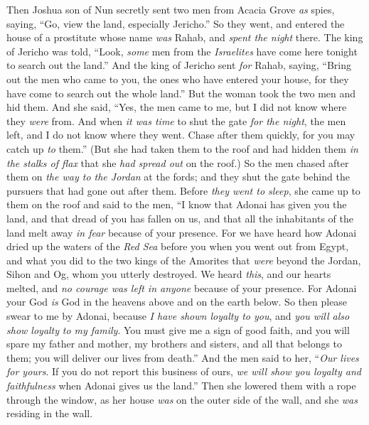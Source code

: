 \begin{biblechapter} %
 Then Joshua son of Nun secretly sent two men from Acacia Grove \textit{as} spies, saying, “Go, view the land, especially Jericho.” So they went, and entered the house of a prostitute whose name \textit{was} Rahab, and \textit{spent the night} there.
\verse The king of Jericho was told, “Look, \textit{some} men from the \textit{Israelites} have come here tonight to search out the land.”
\verse And the king of Jericho sent \textit{for} Rahab, saying, “Bring out the men who came to you, the ones who have entered your house, for they have come to search out the whole land.”
\verse But the woman took the two men and hid them. And she said, “Yes, the men came to me, but I did not know where they \textit{were} from.
\verse And when \textit{it was time} to shut the gate \textit{for the night}, the men left, and I do not know where they went. Chase after them quickly, for you may catch up \textit{to} them.”
\verse (But she had taken them to the roof and had hidden them \textit{in the stalks of flax} that she \textit{had spread out} on the roof.)
\verse So the men chased after them on \textit{the way to the Jordan} at the fords; and they shut the gate behind the pursuers that had gone out after them.
\verse Before \textit{they went to sleep}, she came up to them on the roof
\verse and said to the men, “I know that Adonai has given you the land, and that dread of you has fallen on us, and that all the inhabitants of the land melt away \textit{in fear} because of your presence.
\verse For we have heard how Adonai dried up the waters of the \textit{Red Sea} before you when you went out from Egypt, and what you did to the two kings of the Amorites that \textit{were} beyond the Jordan, Sihon and Og, whom you utterly destroyed.
\verse We heard \textit{this}, and our hearts melted, and \textit{no courage was left in anyone} because of your presence. For Adonai your God \textit{is} God in the heavens above and on the earth below.
\verse So then please swear to me by Adonai, because \textit{I have shown loyalty to you}, and \textit{you will also show loyalty} \textit{to my family}. You must give me a sign of good faith,
\verse and you will spare my father and mother, my brothers and sisters, and all that belongs to them; you will deliver our lives from death.”
\verse And the men said to her, “\textit{Our lives for yours}. If you do not report this business of ours, \textit{we will show you loyalty and faithfulness} when Adonai gives us the land.”
\verse Then she lowered them with a rope through the window, as her house \textit{was} on the outer side of the wall, and she \textit{was} residing in the wall.

\end{biblechapter}
